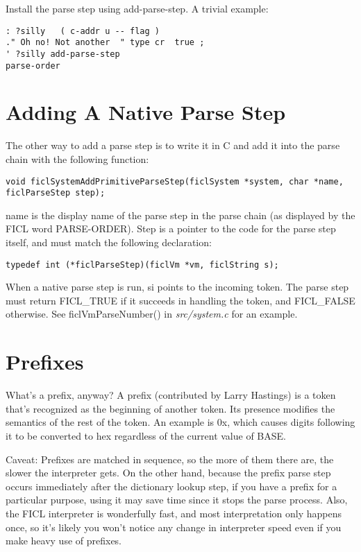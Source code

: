 Install the parse step using add-parse-step. A trivial example:
\begin{lstlisting}[frame=single]
: ?silly   ( c-addr u -- flag )
." Oh no! Not another  " type cr  true ;
' ?silly add-parse-step
parse-order
\end{lstlisting}


\section{Adding A Native Parse Step}
The other way to add a parse step is to write it in C and add it into
the parse chain with the following function:
\begin{lstlisting}[frame=single]
void ficlSystemAddPrimitiveParseStep(ficlSystem *system, char *name, ficlParseStep step);
\end{lstlisting}
name is the display name of the parse step in the parse chain (as
displayed by the FICL word PARSE-ORDER). Step is a pointer to the code
for the parse step itself, and must match the following declaration:
\begin{lstlisting}[frame=single]
typedef int (*ficlParseStep)(ficlVm *vm, ficlString s);
\end{lstlisting}
When a native parse step is run, si points to the incoming token. The
parse step must return FICL\_TRUE if it succeeds in handling the token,
and FICL\_FALSE otherwise. See ficlVmParseNumber() in
\textit{src/system.c} for an example.


\section{Prefixes}
What's a prefix, anyway? A prefix (contributed by Larry Hastings) is a
token that's recognized as the beginning of another token. Its presence
modifies the semantics of the rest of the token. An example is 0x, which
causes digits following it to be converted to hex regardless of the
current value of BASE.

Caveat: Prefixes are matched in sequence, so the more of them there are,
the slower the interpreter gets. On the other hand, because the prefix
parse step occurs immediately after the dictionary lookup step, if you
have a prefix for a particular purpose, using it may save time since it
stops the parse process. Also, the FICL interpreter is wonderfully fast,
and most interpretation only happens once, so it's likely you won't
notice any change in interpreter speed even if you make heavy use of
prefixes.

